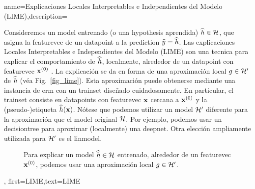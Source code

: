 {name={Explicaciones Locales Interpretables e Independientes del Modelo (LIME)},description={
		Consideremos 
		un \gls{model} entrenado (o una \gls{hypothesis} aprendida) $\widehat{h} \in \mathcal{H}$, 
		que asigna la \gls{featurevec} de un \gls{datapoint} a la \gls{prediction} $\widehat{y}= \widehat{h}$. 
		Las explicaciones Locales Interpretables e Independientes del Modelo (LIME) son una tecnica para explicar 
		el comportamiento de $\widehat{h}$, localmente, alrededor de un \gls{datapoint} con \gls{featurevec} ${\bf x}^{(0)}$ \cite{Ribeiro2016}. 
		La explicación se da en forma de una aproximación local $g \in \mathcal{H}'$ de $\widehat{h}$ (véa Fig.\ \ref{fig_lime}). 
		Esta aproximación puede obtenerse mediante una instancia de \gls{erm} con un 
		\gls{trainset} diseñado cuidadosamente. En particular, el \gls{trainset} consiste en \gls{datapoint}s con 
		\gls{featurevec} ${\bf x}$ cercana a ${\bf x}^{(0)}$ y la (pseudo-)etiqueta $\widehat{h}({\bf x})$. 
		Nótese que podemos utilizar un \gls{model} $\mathcal{H}'$ diferente para la aproximación que 
		el \gls{model} original $\mathcal{H}$. Por ejemplo, podemos usar un \gls{decisiontree} 
		para aproximar (localmente) una \gls{deepnet}. Otra elección ampliamente utilizada para $\mathcal{H}'$ es 
		el \gls{linmodel}. 
		\begin{figure}[htbp]
		\begin{center}
		\end{center}
		\caption{Para explicar un \gls{model} $\widehat{h} \in \mathcal{H}$ entrenado, alrededor de un \gls{featurevec} ${\bf x}^{(0)}$, podemos usar una aproximación local $g \in \mathcal{H}'$. }
		\end{figure}\label{fig_lime}},
	first={LIME},text={LIME}
}


